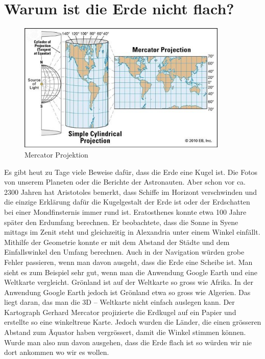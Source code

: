 

\section{Warum ist die Erde nicht flach?}

\begin{figure}[h]
	\begin{center}
		\includegraphics[width=10cm]{papers/nav/bilder/projektion.png}
		\caption[Mercator Projektion]{Mercator Projektion}
	\end{center}	
\end{figure}

Es gibt heut zu Tage viele Beweise dafür, dass die Erde eine Kugel ist. 
Die Fotos von unserem	Planeten oder die Berichte der Astronauten. 
Aber schon vor ca. 2300 Jahren hat Aristotoles bemerkt, dass Schiffe im Horizont verschwinden und die einzige Erklärung dafür die Kugelgestalt der Erde ist oder der Erdschatten bei einer Mondfinsternis immer rund ist. 
Eratosthenes konnte etwa 100 Jahre später den Erdumfang berechnen. 
Er beobachtete, dass die Sonne in Syene mittags im Zenit steht und gleichzeitig in Alexandria unter einem Winkel einfällt. 
Mithilfe der Geometrie konnte er mit dem Abstand der Städte und dem Einfallswinkel den Umfang berechnen.
Auch in der Navigation würden grobe Fehler passieren, wenn man davon ausgeht, dass die Erde eine Scheibe ist. 
Man sieht es zum Beispiel sehr gut, wenn man die Anwendung Google Earth und eine Weltkarte vergleicht. Grönland ist auf der Weltkarte so gross wie Afrika. 
In der Anwendung Google Earth jedoch ist Grönland etwa so gross wie Algerien. 
Das liegt daran, das man die 3D – Weltkarte nicht einfach auslegen kann. 
Der Kartograph Gerhard Mercator projizierte die Erdkugel auf ein Papier und erstellte so eine winkeltreue Karte. Jedoch wurden die Länder, die einen grösseren Abstand zum Äquator haben vergrössert, damit die Winkel stimmen können. 
Wurde man also nun davon ausgehen, dass die Erde flach ist so würden wir nie dort ankommen wo wir es wollen.
